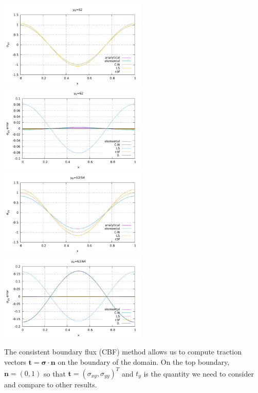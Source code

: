 \begin{center}
\includegraphics[width=7cm]{python_codes/fieldstone_27/results/62_64/sigmazz.pdf}
\includegraphics[width=7cm]{python_codes/fieldstone_27/results/62_64/sigmazz_error.pdf}\\
\includegraphics[width=7cm]{python_codes/fieldstone_27/results/63_64/sigmazz.pdf}
\includegraphics[width=7cm]{python_codes/fieldstone_27/results/63_64/sigmazz_error.pdf}
\end{center}

The consistent boundary flux (CBF) method allows us to compute traction vectors ${\bm t}={\bm \sigma}\cdot{\bm n}$
on the boundary of the domain. On the top boundary, ${\bm n}=(0,1)$ so that ${\bm t}=(\sigma_{xy}, \sigma_{yy})^T$ and 
$t_y$ is the quantity we need to consider and compare to other results.

